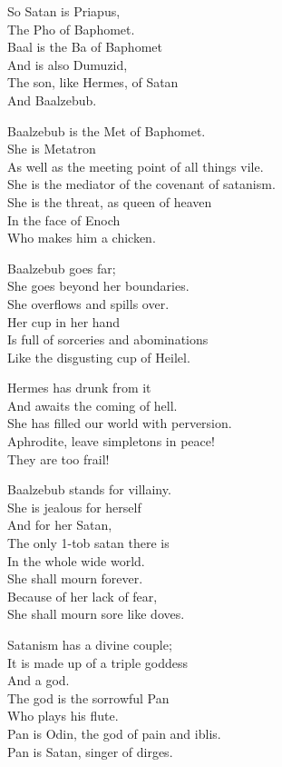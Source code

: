 \documentclass[
]{book}
\begin{document}
So Satan is Priapus,\\
The Pho of Baphomet.\\
Baal is the Ba of Baphomet\\
And is also Dumuzid,\\
The son, like Hermes, of Satan\\
And Baalzebub.

Baalzebub is the Met of Baphomet.\\
She is Metatron\\
As well as the meeting point of all things vile.\\
She is the mediator of the covenant of satanism.\\
She is the threat, as queen of heaven\\
In the face of Enoch\\
Who makes him a chicken.

Baalzebub goes far;\\
She goes beyond her boundaries.\\
She overflows and spills over.\\
Her cup in her hand\\
Is full of sorceries and abominations\\
Like the disgusting cup of Heilel.

Hermes has drunk from it\\
And awaits the coming of hell.\\
She has filled our world with perversion.\\
Aphrodite, leave simpletons in peace!\\
They are too frail!

Baalzebub stands for villainy.\\
She is jealous for herself\\
And for her Satan,\\
The only 1-tob satan there is\\
In the whole wide world.\\
She shall mourn forever.\\
Because of her lack of fear,\\
She shall mourn sore like doves.

Satanism has a divine couple;\\
It is made up of a triple goddess\\
And a god.\\
The god is the sorrowful Pan\\
Who plays his flute.\\
Pan is Odin, the god of pain and iblis.\\
Pan is Satan, singer of dirges.
\end{document}
